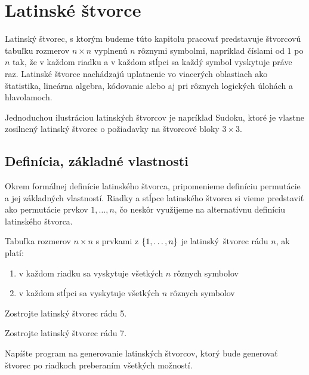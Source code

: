 \chapter{Latinské štvorce}
Latinský štvorec, s ktorým budeme túto kapitolu pracovať predstavuje štvorcovú tabuľku rozmerov $n \times n$ vyplnenú $n$ rôznymi symbolmi, napríklad číslami od $1$ po $n$ tak, že v každom riadku a v každom stĺpci sa každý symbol vyskytuje práve raz. Latinské štvorce nachádzajú uplatnenie vo viacerých oblastiach ako štatistika, lineárna algebra, kódovanie alebo aj pri rôznych logických úlohách a hlavolamoch. 

Jednoduchou ilustráciou latinských štvorcov je napríklad Sudoku, ktoré je vlastne zosilnený latinský štvorec o požiadavky na štvorcové bloky $3 \times 3$.

\section{Definícia, základné vlastnosti}
Okrem formálnej definície latinského štvorca, pripomenieme definíciu permutácie a jej základných vlastností. Riadky a stĺpce latinského štvorca si vieme predstaviť ako permutácie prvkov $1, \ldots, n$, čo neskôr využijeme na alternatívnu definíciu latinského štvorca.

\begin{definition}
Tabuľka rozmerov $n\times n$ s prvkami z $\left\{1, \ldots, n\right\}$ je latinský~štvorec rádu $n$, ak platí:
\begin{enumerate}
    \item v každom riadku sa vyskytuje všetkých $n$ rôznych symbolov
    \item v každom stĺpci sa vyskytuje všetkých $n$ rôznych symbolov
\end{enumerate}
\end{definition}

\begin{exercise}
Zostrojte latinský štvorec rádu 5.
\end{exercise}

\begin{exercise}
Zostrojte latinský štvorec rádu 7.
\end{exercise}

\begin{exercise}
Napíšte program na generovanie latinských štvorcov, ktorý bude generovať štvorec po riadkoch preberaním všetkých možností.
\end{exercise}

